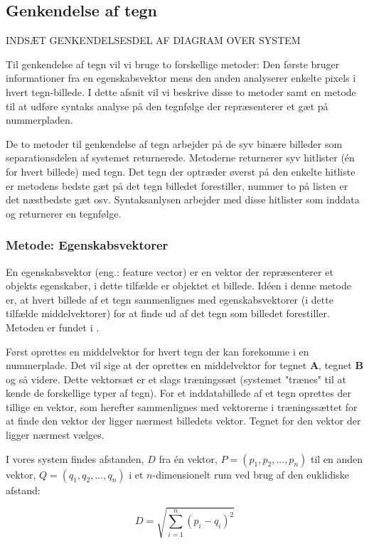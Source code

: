 \subsection{Genkendelse af tegn}

INDSÆT GENKENDELSESDEL AF DIAGRAM OVER SYSTEM
\label{sec_monster}

Til genkendelse af tegn vil vi bruge to forskellige metoder: Den første bruger informationer fra en egenskabsvektor mens den anden analyserer enkelte pixels i hvert tegn-billede. I dette afsnit vil vi beskrive disse to metoder samt en metode til at udføre syntaks analyse på den tegnfølge der repræsenterer et gæt på nummerpladen.

De to metoder til genkendelse af tegn arbejder på de syv binære billeder som separationsdelen af systemet returnerede. Metoderne returnerer syv hitlister (én for hvert billede) med tegn. Det tegn der optræder øverst på den enkelte hitliste er metodens bedste gæt på det tegn billedet forestiller, nummer to på listen er det næstbedste gæt osv. Syntaksanlysen arbejder med disse hitlister som inddata og returnerer en tegnfølge.

\subsubsection{Metode: Egenskabsvektorer}
En egenskabsvektor (eng.: feature vector) er en vektor der repræsenterer et objekts egenskaber, i dette tilfælde er objektet et billede. Idéen i denne metode er, at hvert billede af et tegn sammenlignes med egenskabsvektorer (i dette tilfælde middelvektorer) for at finde ud af det tegn som billedet forestiller. Metoden er fundet i \cite{arth}.

Først oprettes en middelvektor for hvert tegn der kan forekomme i en nummerplade. Det vil sige at der oprettes en middelvektor for tegnet \textbf{A}, tegnet \textbf{B} og så videre. Dette vektorsæt er et slags træningssæt (systemet "trænes" til at kende de forskellige typer af tegn). For et inddatabillede af et tegn oprettes der tillige en vektor, som herefter sammenlignes med vektorerne i træningssættet for at finde den vektor der ligger nærmest billedets vektor. Tegnet for den vektor der ligger nærmest vælges. 

I vores system findes afstanden, $D$ fra én vektor, $P = (p_{1},p_{2},...,p_{n})$ til en anden vektor, $Q = (q_{1},q_{2},...,q_{n})$ i et $n$-dimensionelt rum ved brug af den euklidiske afstand\cite{wiki_euclid}:

\begin{displaymath}
	D = \sqrt{\sum_{i=1}^{n}(p_{i}-q_{i})^{2}}
\end{displaymath}

